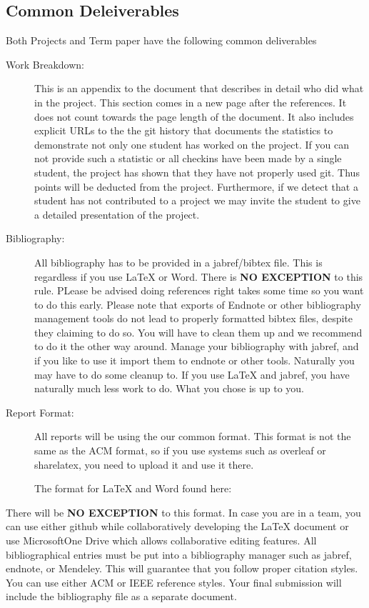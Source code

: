 \subsection{Common Deleiverables}

Both Projects and Term paper have the following common deliverables

\begin{description}
\item[Work Breakdown:]
This is an appendix to the document that describes in detail who did
what in the project. This section comes in a new page after the
references. It does not count towards the page length of the document.
It also includes explicit URLs to the the git history that documents the
statistics to demonstrate not only one student has worked on the
project. If you can not provide such a statistic or all checkins have
been made by a single student, the project has shown that they have not
properly used git. Thus points will be deducted from the project.
Furthermore, if we detect that a student has not contributed to a
project we may invite the student to give a detailed presentation of the
project.
\item[Bibliography:]
All bibliography has to be provided in a jabref/bibtex file. This is
regardless if you use LaTeX or Word. There is \textbf{NO EXCEPTION} to
this rule. PLease be advised doing references right takes some time so
you want to do this early. Please note that exports of Endnote or other
bibliography management tools do not lead to properly formatted bibtex
files, despite they claiming to do so. You will have to clean them up
and we recommend to do it the other way around. Manage your bibliography
with jabref, and if you like to use it import them to endnote or other
tools. Naturally you may have to do some cleanup to. If you use LaTeX
and jabref, you have naturally much less work to do. What you chose is
up to you.
\item[Report Format:]
All reports will be using the our common format. This format is not the
same as the ACM format, so if you use systems such as overleaf or
sharelatex, you need to upload it and use it there.

The format for LaTeX and Word found here:


\end{description}

There will be \textbf{NO EXCEPTION} to this format. In case you are in a
team, you can use either github while collaboratively developing the
LaTeX document or use MicrosoftOne Drive which allows collaborative
editing features. All bibliographical entries must be put into a
bibliography manager such as jabref, endnote, or Mendeley. This will
guarantee that you follow proper citation styles. You can use either ACM
or IEEE reference styles. Your final submission will include the
bibliography file as a separate document.

